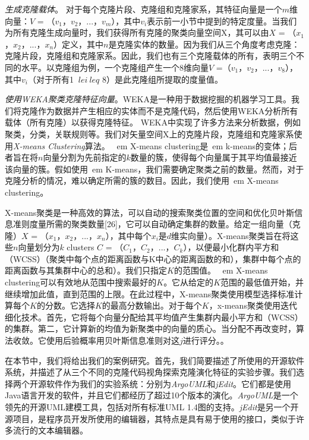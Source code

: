  {\em 生成克隆载体}。 对于每个克隆片段、克隆组和克隆家系，其特征向量是一个$ m $维向量：{$ V $ = {（$ v_1 $，$ v_2 $，$ ... $，$ v_m $）}}，其中$ v_i $表示前一小节中提到的特定度量。当我们为所有克隆生成向量时，我们获得所有克隆的聚类向量空间X，其可以由{$ X $ = {（$ x_1 $，$ x_2 $，$ ... $，$ x_n $）}定义}，其中$ n $是克隆实体的数量。因为我们从三个角度考虑克隆：克隆片段，克隆组和克隆家系。因此，我们也有三个克隆载体的所有，表明三个不同的水平。以克隆组为例，一个克隆组产生一个8维向量{$ V $ =（$ v_1 $，$ v_2 $，$ ... $，$ v_8 $）}，其中$ v_i $（对于所有1 $ \ le $$ i $$ \ leq $ 8）是此克隆组所提取的度量值。
  
 {\em 使用WEKA聚类克隆特征向量}。WEKA是一种用于数据挖掘的机器学习工具。我们将克隆作为数据并产生相应的实体而不是克隆代码，然后使用WEKA分析所有载体（所有克隆）以获得克隆特征。 WEKA中实现了许多方法来分析数据，例如聚类，分类，关联规则等。我们对矢量空间X上的克隆片段，克隆组和克隆家系使用{\em X-means Clustering}算法。 {\ em X-means clustering}是{\ em k-means}的变体；后者旨在将$ n $向量分割为先前指定的$ k $数量的簇，使得每个向量属于其平均值最接近该向量的簇。假如使用{\ em K-means}，我们需要确定聚类之前的数量。然而，对于克隆分析的情况，难以确定所需的簇的数目。因此，我们使用{\ em X-means clustering}。

X-means聚类是一种高效的算法，可以自动的搜索聚类位置的空间和优化贝叶斯信息准则度量所需的聚类数量[26]，它可以自动确定集群的数量。给定一组向量（克隆）$ X $ = {（$ x_1 $，$ x_2 $，$ ... $，$ x_n $）}，其中每个$ x_i $是$ d $维实向量）。X-means聚类旨在将这些$ n $向量划分为$ k $ clusters $ C $ = {（$ C_1 $，$ C_2 $，$ ... $，$ C_k $）}，以便最小化群内平方和（WCSS）（聚类中每个点的距离函数与K中心的距离函数的和），集群中每个点的距离函数与其集群中心的总和）。我们只指定$ K $的范围值。 {\ em X-means clustering}可以有效地从范围中搜索最好的$ K $。它从给定的$ K $范围的最低值开始，并继续增加此值，直到范围的上限。在此过程中，X-means聚类使用模型选择标准计算每个$ K $的分数。它选择$ K $的最高分数输出。对于每个$ K $，x-means聚类使用迭代细化技术。首先，它将每个向量分配给其平均值产生集群内最小平方和（WCSS）的集群。第二，它计算新的均值为新聚类中的向量的质心。当分配不再改变时，算法收敛。它使用后验概率用贝叶斯信息准则对这$ j $进行评分。。


在本节中，我们将给出我们的案例研究。首先，我们简要描述了所使用的开源软件系统，并描述了从三个不同的克隆代码视角探索克隆演化特征的实验步骤。我们选择两个开源软件作为我们的实验系统：分别为{\em ArgoUML}和{\em jEdit}。它们都是使用Java语言开发的软件，并且它们都经历了超过10个版本的演化。{\em ArgoUML}是一个领先的开源UML建模工具，包括对所有标准UML 1.4图的支持。{\em jEdit}是另一个开源项目，是程序员开发所使用的编辑器，其特点是具有易于使用的接口，类似于许多流行的文本编辑器。\\

